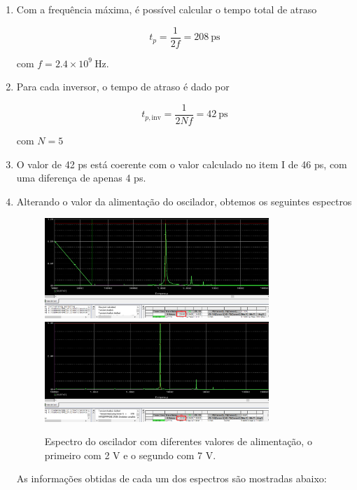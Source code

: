 \documentclass[11pt]{article}
\begin{document}
\begin{enumerate}[label=\alph*)]
\item Com a frequência máxima, é possível calcular o tempo total de atraso

\begin{equation}
    t_p = \frac{1}{2 f} = 208\ \text{ps}
\end{equation}

com $f=2.4\times 10^{9}\ \text{Hz}$.

\item Para cada inversor, o tempo de atraso é dado por

\begin{equation}
    t_{p,\text{inv}} = \frac{1}{2 N f} = 42\ \text{ps}
\end{equation}

com $N=5$

\item O valor de 42 ps está coerente com o valor calculado no item I de 46 ps, com uma diferença de apenas 4 ps.

\item Alterando o valor da alimentação do oscilador, obtemos os seguintes espectros

\begin{figure}
    \centering
    \includegraphics[width=0.8\textwidth]{imgs/fft_2.png}
    \includegraphics[width=0.8\textwidth]{imgs/fft_7.png}
    \caption{Espectro do oscilador com diferentes valores de alimentação, o primeiro com 2 V e o segundo com 7 V.}
    \label{fig:fft_alim}
\end{figure}

As informações obtidas de cada um dos espectros são mostradas abaixo:


\end{enumerate}
\end{document}
